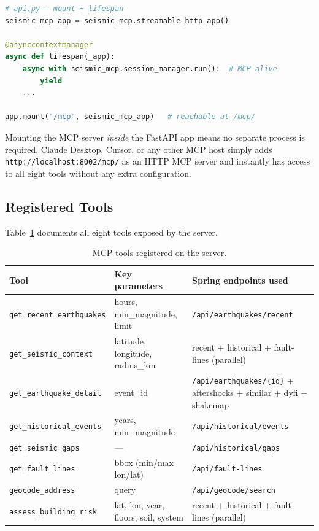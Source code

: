 \documentclass[11pt,a4paper]{article}
\begin{document}
\begin{lstlisting}[style=codestyle, language=Python]
# api.py — mount + lifespan
seismic_mcp_app = seismic_mcp.streamable_http_app()

@asynccontextmanager
async def lifespan(_app):
    async with seismic_mcp.session_manager.run():  # MCP alive
        yield
    ...

app.mount("/mcp", seismic_mcp_app)   # reachable at /mcp/
\end{lstlisting}

\begin{designnote}
Mounting the MCP server \emph{inside} the FastAPI app means no separate process is
required. Claude Desktop, Cursor, or any other MCP host simply adds
\texttt{http://localhost:8002/mcp/} as an HTTP MCP server and instantly has access
to all eight tools without any extra configuration.
\end{designnote}

\subsection{Registered Tools}

Table~\ref{tab:tools} documents all eight tools exposed by the server.

\begin{table}[H]
\centering
\begin{tabular}{@{}p{4.8cm}p{4.4cm}p{4.8cm}@{}}
\toprule
\textbf{Tool} & \textbf{Key parameters} & \textbf{Spring endpoints used} \\
\midrule
\texttt{get\_recent\_earthquakes}   & hours, min\_magnitude, limit           & \texttt{/api/earthquakes/recent} \\
\texttt{get\_seismic\_context}      & latitude, longitude, radius\_km        & recent + historical + fault-lines (parallel) \\
\texttt{get\_earthquake\_detail}    & event\_id                              & \texttt{/api/earthquakes/\{id\}} + aftershocks + similar + dyfi + shakemap \\
\texttt{get\_historical\_events}    & years, min\_magnitude                  & \texttt{/api/historical/events} \\
\texttt{get\_seismic\_gaps}         & ---                                    & \texttt{/api/historical/gaps} \\
\texttt{get\_fault\_lines}          & bbox (min/max lon/lat)                 & \texttt{/api/fault-lines} \\
\texttt{geocode\_address}           & query                                  & \texttt{/api/geocode/search} \\
\texttt{assess\_building\_risk}     & lat, lon, year, floors, soil, system   & recent + historical + fault-lines (parallel) \\
\bottomrule
\end{tabular}
\caption{MCP tools registered on the server.}
\label{tab:tools}
\end{table}
\end{document}

